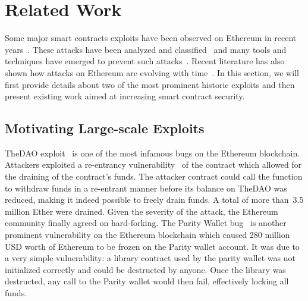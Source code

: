 \section{Related Work}
\label{sec:related}

Some major smart contracts exploits have been observed on Ethereum in recent years~\cite{Securities2017}. These attacks have been analyzed and classified~\cite{Atzei2017} and many tools and techniques have emerged to prevent such attacks~\cite{harz2018towards,Dika2017}.
Recent literature has also shown how attacks on Ethereum are evolving with time~\cite{255252}.
In this section, we will first provide details about two of the most prominent historic exploits and then present existing work aimed at increasing smart contract security.

\subsection{Motivating Large-scale Exploits}
TheDAO exploit~\cite{Securities2017} is one of the most infamous bugs on the Ethereum blockchain. Attackers exploited a re-entrancy vulnerability~\cite{Atzei2017} of the contract which allowed for the draining of the contract's funds. The attacker contract could call the function to withdraw funds in a re-entrant manner before its balance on TheDAO was reduced, making it indeed possible to freely drain funds. A total of more than~3.5 million Ether were drained. Given the severity of the attack, the Ethereum community finally agreed on hard-forking.
%
The Parity Wallet bug~\cite{Breidenbach} is another prominent vulnerability on the Ethereum blockchain which caused 280 million USD worth of Ethereum to be frozen on the Parity wallet account. It was due to a very simple vulnerability: a library contract used by the parity wallet was not initialized correctly and could be destructed by anyone. Once the library was destructed, any call to the Parity wallet would then fail, effectively locking all funds.



